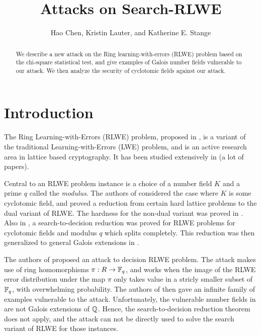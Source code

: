 \documentclass{amsart}
\title{Attacks on Search-RLWE}
\author{Hao Chen, Kristin Lauter, and Katherine E. Stange}
\begin{document}
\maketitle

\begin{abstract}
We describe a new attack on the Ring learning-with-errors (RLWE) problem based on the chi-square statistical test, and give examples of Galois number fields vulnerable to our attack. We then analyze the security of cyclotomic fields against our attack.

\end{abstract}

\section{Introduction}
The Ring Learning-with-Errors (RLWE) problem, proposed in \cite{lyubashevsky2013ideal}, is a variant of the traditional Learning-with-Errors (LWE) problem, and is an active research area in lattice based cryptography. It has been studied extensively in (a lot of papers).

Central to an RLWE problem instance is a choice of a number field $K$ and a prime $q$ called the {\it modulus}. The authors of \cite{lyubashevsky2013ideal} considered the case where $K$ is some cyclotomic field, and proved a reduction from certain hard lattice problems to the dual variant of RLWE. The hardness for the non-dual variant was proved in \cite{ducas2012ring}. Also in \cite{lyubashevsky2013ideal}, a search-to-decision reduction was proved for RLWE problems for cyclotomic fields and modulus $q$ which splits completely. This reduction was then generalized to general Galois extensions in \cite{eisentrager2014weak}.

The authors of \cite{elos2015weak} proposed an attack to decision RLWE problem. The attack makes use of ring homomorphisms $\pi: R \to \mathbb{F}_q$, and works when the image of the RLWE error distribution under the map $\pi$ only takes value in a stricly smaller subset of $\mathbb{F}_q$, with overwhelming probability. The authors of \cite{elos2015weak} then gave an infinite family of examples vulnerable to the attack. Unfortunately, the vulnerable number fields in \cite{elos2015weak} are not Galois extensions of $\mathbb{Q}$. Hence, the search-to-decision reduction theorem does not apply, and the attack can not be directly used to solve the search variant of RLWE for those instances.
\end{document}

